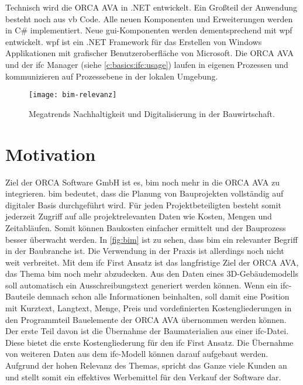 Technisch wird die ORCA AVA in .NET entwickelt. Ein Großteil der Anwendung besteht noch aus \ac{vb} Code. Alle neuen Komponenten und Erweiterungen werden in C\# implementiert. Neue \ac{gui}-Komponenten werden dementsprechend mit \ac{wpf} entwickelt. \ac{wpf} ist ein .NET Framework für das Erstellen von Windows Applikationen mit grafischer Benutzeroberfläche von Microsoft. \citep[vgl.][]{Microsoft_2022} Die ORCA AVA und der \ac{ifc} Manager (siehe \autoref{c:basics:ifc:usage}) laufen in eigenen Prozessen und kommunizieren auf Prozessebene in der lokalen Umgebung. 

\begin{figure}[h]
	\centering
	\texttt{[image: bim-relevanz]}
	\caption{Megatrends Nachhaltigkeit und Digitalisierung in der Bauwirtschaft.}
	\label{fig:bim}
\end{figure}

\section{Motivation}
\label{c:intro:motivation}

Ziel der \glqq ORCA Software GmbH\grqq{} ist es, \ac{bim} noch mehr in die ORCA AVA zu integrieren. \ac{bim} bedeutet, dass die Planung von Bauprojekten vollständig auf digitaler Basis durchgeführt wird.  Für jeden Projektbeteiligten besteht somit jederzeit Zugriff auf alle projektrelevanten Daten wie Kosten, Mengen und Zeitabläufen. Somit können Baukosten einfacher ermittelt und der Bauprozess besser überwacht werden. In \autoref{fig:bim} ist zu sehen, dass \ac{bim} ein relevanter Begriff in der Baubranche ist. Die Verwendung in der Praxis ist allerdings noch nicht weit verbreitet. \citep[vgl.][p.~20]{RolandBerger2016} Mit dem \glqq \ac{ifc} First\grqq{} Ansatz ist das langfristige Ziel der ORCA AVA, das Thema \ac{bim} noch mehr abzudecken. Aus den Daten eines 3D-Gebäudemodells soll automatisch ein Ausschreibungstext generiert werden können. Wenn ein \ac{ifc}-Bauteile demnach schon alle Informationen beinhalten, soll damit eine Position mit Kurztext, Langtext, Menge, Preis und vordefinierten Kostengliederungen in den Programmteil Bauelemente der ORCA AVA übernommen werden können. Der erste Teil davon ist die Übernahme der Baumaterialien aus einer \ac{ifc}-Datei. Diese bietet die erste Kostengliederung für den \glqq \ac{ifc} First\grqq{} Ansatz. Die Übernahme von weiteren Daten aus dem \ac{ifc}-Modell können darauf aufgebaut werden. Aufgrund der hohen Relevanz des Themas, spricht das Ganze viele Kunden an und stellt somit ein effektives Werbemittel für den Verkauf der Software dar. 

